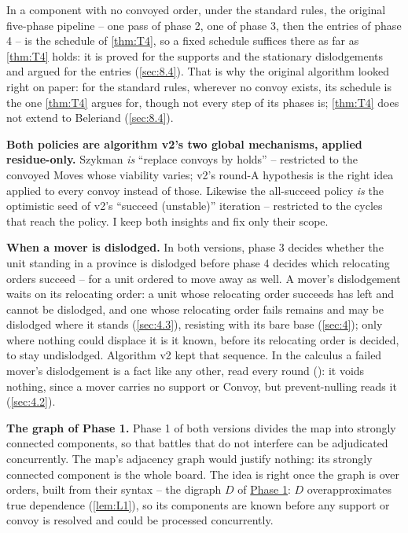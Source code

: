 \documentclass[12pt,a4paper]{article}
\begin{document}
In a component with no convoyed order, under the standard rules, the original five-phase pipeline -- one pass of phase 2, one of phase 3, then the entries of phase 4 -- is the schedule of \cref{thm:T4}, so a fixed schedule suffices there as far as \cref{thm:T4} holds: it is proved for the supports and the stationary dislodgements and argued for the entries (\cref{sec:8.4}).
That is why the original algorithm looked right on paper: for the standard rules, wherever no convoy exists, its schedule is the one \cref{thm:T4} argues for, though not every step of its phases is; \cref{thm:T4} does not extend to Beleriand (\cref{sec:8.4}).

\textbf{Both policies are algorithm v2's two global mechanisms, applied residue-only.}
Szykman \emph{is} ``replace convoys by holds'' -- restricted to the convoyed Moves whose viability varies; v2's round-A hypothesis is the right idea applied to every convoy instead of those.
Likewise the all-succeed policy \emph{is} the optimistic seed of v2's ``succeed (unstable)'' iteration -- restricted to the cycles that reach the policy.
I keep both insights and fix only their scope.

 \textbf{When a mover is dislodged.}
In both versions, phase 3 decides whether the unit standing in a province is dislodged before phase 4 decides which relocating orders succeed -- for a unit ordered to move away as well.
A mover's dislodgement waits on its relocating order: a unit whose relocating order succeeds has left and cannot be dislodged, and one whose relocating order fails remains and may be dislodged where it stands (\cref{sec:4.3}), resisting with its bare base (\cref{sec:4}); only where nothing could displace it is it known, before its relocating order is decided, to stay undislodged.
Algorithm v2 kept that sequence.
In the calculus a failed mover's dislodgement is a fact like any other, read every round (): it voids nothing, since a mover carries no support or Convoy, but prevent-nulling reads it (\cref{sec:4.2}).

 \textbf{The graph of Phase 1.}
Phase 1 of both versions divides the map into strongly connected components, so that battles that do not interfere can be adjudicated concurrently.
The map's adjacency graph would justify nothing: its strongly connected component is the whole board.
The idea is right once the graph is over orders, built from their syntax -- the digraph $D$ of \hyperref[sec:6.phase1]{Phase 1}: $D$ overapproximates true dependence (\cref{lem:L1}), so its components are known before any support or convoy is resolved and could be processed concurrently.
\end{document}
